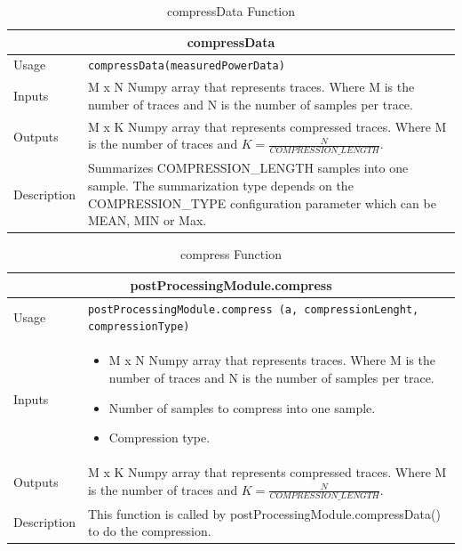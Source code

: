 \documentclass{llncs}
\numberwithin{algorithm}{chapter}
\begin{document}
\begin{table}[H]
\caption{compressData Function}
\begin{tabular}{ |p{2cm}||p{11cm}|  }
 \hline
 \multicolumn{2}{|c|}{\cellcolor{teal}\textbf{compressData}} \\
 \hline
 Usage & \texttt{compressData(measuredPowerData)}\\ \hline
 Inputs & M x N Numpy array that represents traces. Where M is the number of traces and N is the number of samples per trace. \\ \hline
 Outputs & M x K Numpy array that represents compressed traces. Where M is the number of traces and $K = \frac{N}{COMPRESSION\_LENGTH}$.  \\ \hline
 Description & Summarizes COMPRESSION\_LENGTH samples into one sample. The summarization type depends on the COMPRESSION\_TYPE configuration parameter which can be MEAN, MIN or Max. \\ \hline
\end{tabular}
\end{table}
\begin{table}[H]
\caption{compress Function}
\begin{tabular}{ |p{2cm}||p{11cm}|  }
 \hline
 \multicolumn{2}{|c|}{\cellcolor{teal}\textbf{postProcessingModule.compress}} \\
 \hline
 Usage & \texttt{postProcessingModule.compress (a, compressionLenght, compressionType)}\\ \hline
 Inputs & \begin{itemize}
 		  \item M x N Numpy array that represents traces. Where M is the number of traces and N is the number of samples per trace.
 		  \item Number of samples to compress into one sample.
          \item Compression type.
          \end{itemize} \\ \hline
 Outputs &  M x K Numpy array that represents compressed traces. Where M is the number of traces and $K = \frac{N}{COMPRESSION\_LENGTH}$.  \\ \hline
 Description & This function is called by postProcessingModule.compressData() to do the compression. \\ \hline
\end{tabular}
\end{table}
\end{document}
